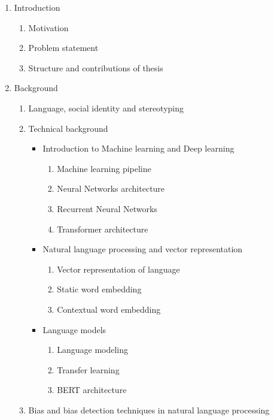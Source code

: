\begin{enumerate}
    \item Introduction
        \begin{enumerate}
            \item Motivation
            \item Problem statement
            \item Structure and contributions of thesis
        \end{enumerate}
    \item Background
        \begin{enumerate}
        \item Language, social identity and stereotyping
        \item Technical background
        \begin{itemize}
            \item Introduction to Machine learning and Deep learning 
                \begin{enumerate}
                    \item Machine learning pipeline
                    \item Neural Networks architecture
                    \item Recurrent Neural Networks
                    \item Transformer architecture
                \end{enumerate}
            \item Natural language processing and vector representation
                \begin{enumerate}
                    \item Vector representation of language 
                    \item Static word embedding
                    \item Contextual word embedding
                \end{enumerate}
            \item Language models
                \begin{enumerate}
                    \item Language modeling
                    \item Transfer learning
                    \item BERT architecture
                \end{enumerate}
        \end{itemize}
            \item Bias and bias detection techniques in natural language processing

\end{enumerate}
\end{enumerate}
